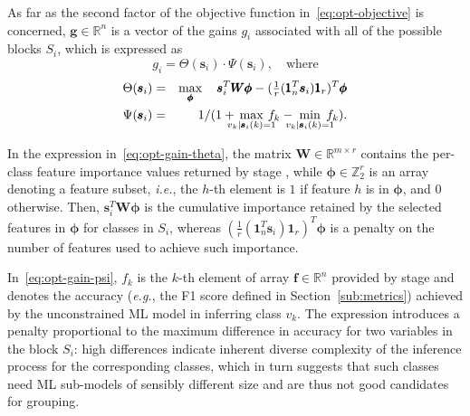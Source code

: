\documentclass[journal]{IEEEtran}
\theoremstyle{plain} %
\newcommand{\eg}{\textit{e.g.},\xspace}
\newcommand{\ie}{\textit{i.e.},\xspace}
\newcommand*\numO[1]{\raisebox{.5pt}{\textcircled{\raisebox{-.9pt} {#1}}}}
\begin{document}
As far as the second factor of the objective function in~\eqref{eq:opt-objective} is concerned, $\pmb{g} \in \mathbb{R}^n$ is a vector of the gains $g_i$ associated with all of the possible blocks $S_i$, which is expressed as
\begin{equation}
    g_i = \Theta(\pmb{s}_i) \cdot \Psi(\pmb{s}_i), \quad\text{where}\label{eq:opt-gain}
\end{equation}
\begin{eqnarray}
    \Theta(\pmb{s}_i) &=& \max_{\pmb{\phi}} \quad \pmb{s}_i^T\pmb{W\phi} - (\tfrac{1}{r}(\pmb{1}_n^T\pmb{s}_i)\pmb{1}_r)^T\pmb{\phi} \label{eq:opt-gain-theta} \\
    \Psi(\pmb{s}_i) &=& 1/(1 + \hspace*{-8pt}\max_{v_k|\pmb{s}_i(k)=1} \hspace*{-8pt} f_k - \hspace*{-8pt}\min_{v_k|\pmb{s}_i(k)=1} \hspace*{-8pt} f_k). \label{eq:opt-gain-psi}
\end{eqnarray}

In the expression in~\eqref{eq:opt-gain-theta}, the matrix $\pmb{W}\in\mathbb{R}^{m \times r}$ contains the per-class feature importance values returned by stage \numO{2},
while $\pmb{\phi} \in \mathbb{Z}^r_2$ is an array denoting a feature subset, \ie the $h$-th element is $1$ if feature $h$ is in $\pmb{\phi}$, and $0$ otherwise. Then, $\pmb{s}_i^T\pmb{W\phi}$ is the cumulative importance retained by the selected features in $\pmb{\phi}$ for classes in $S_i$, whereas $(\tfrac{1}{r}(\pmb{1}_n^T\pmb{s}_i)\pmb{1}_r)^T\pmb{\phi}$ is a penalty on the number of features used to achieve such importance.

In~\eqref{eq:opt-gain-psi}, $f_k$ is the $k$-th element of array $\pmb{f}\in\mathbb{R}^n$ provided by stage \numO{2} and denotes the accuracy (\eg the F1 score defined in Section~\ref{sub:metrics}) achieved by the unconstrained ML model in inferring class $v_k$.
The expression introduces a penalty proportional to the maximum difference in accuracy for two variables in the block $S_i$: high differences indicate inherent diverse complexity of the inference process for the corresponding classes, which in turn suggests that such classes need ML sub-models of sensibly different size and are thus not good candidates for grouping.
\end{document}
